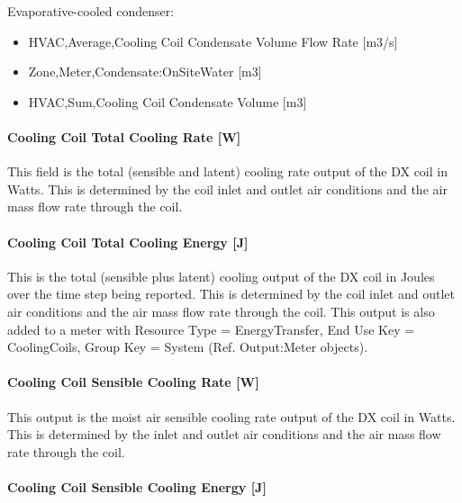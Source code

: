 Evaporative-cooled condenser:

\begin{itemize}
\item
  HVAC,Average,Cooling Coil Condensate Volume Flow Rate {[}m3/s{]}
\item
  Zone,Meter,Condensate:OnSiteWater {[}m3{]}
\item
  HVAC,Sum,Cooling Coil Condensate Volume {[}m3{]}
\end{itemize}

\paragraph{Cooling Coil Total Cooling Rate {[}W{]}}\label{cooling-coil-total-cooling-rate-w-2}

This field is the total (sensible and latent) cooling rate output of the DX coil in Watts. This is determined by the coil inlet and outlet air conditions and the air mass flow rate through the coil.

\paragraph{Cooling Coil Total Cooling Energy {[}J{]}}\label{cooling-coil-total-cooling-energy-j-2}

This is the total (sensible plus latent) cooling output of the DX coil in Joules over the time step being reported. This is determined by the coil inlet and outlet air conditions and the air mass flow rate through the coil. This output is also added to a meter with Resource Type = EnergyTransfer, End Use Key = CoolingCoils, Group Key = System (Ref. Output:Meter objects).

\paragraph{Cooling Coil Sensible Cooling Rate {[}W{]}}\label{cooling-coil-sensible-cooling-rate-w-2}

This output is the moist air sensible cooling rate output of the DX coil in Watts. This is determined by the inlet and outlet air conditions and the air mass flow rate through the coil.

\paragraph{Cooling Coil Sensible Cooling Energy {[}J{]}}\label{cooling-coil-sensible-cooling-energy-j-2}

